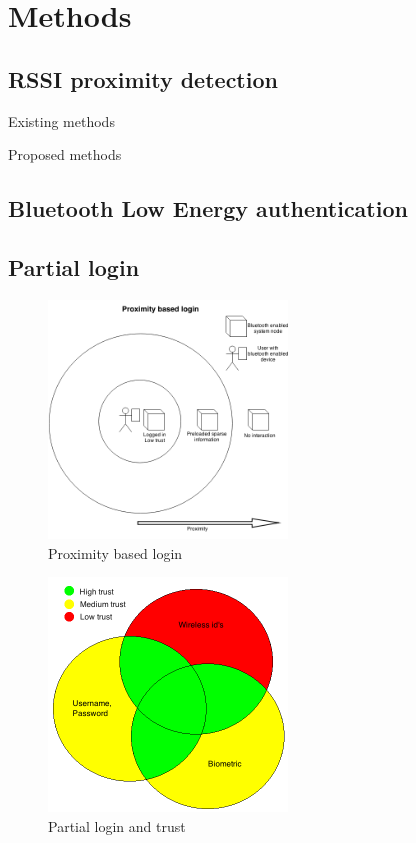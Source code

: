 \section{Methods}

\subsection{RSSI proximity detection}

Existing methods

Proposed methods

\subsection{Bluetooth Low Energy authentication}

\subsection{Partial login}

\begin{figure}[!t]
	\centering
	\includegraphics[width=2.5in]{img/proximityBasedLogin}
	\caption{ Proximity based login }
	\label{fig_proximity_based_login}
\end{figure}

\begin{figure}[!t]
	\centering
	\includegraphics[width=2.5in]{img/authenticationModel}
	\caption{ Partial login and trust }
	\label{fig_authentication_model}
\end{figure}